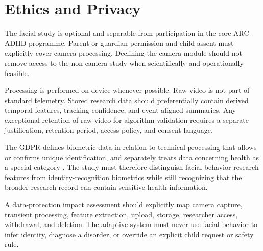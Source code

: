 \section{Ethics and Privacy}

The facial study is optional and separable from participation in the core ARC-ADHD programme. Parent or guardian permission and child assent must explicitly cover camera processing. Declining the camera module should not remove access to the non-camera study when scientifically and operationally feasible.

Processing is performed on-device whenever possible. Raw video is not part of standard telemetry. Stored research data should preferentially contain derived temporal features, tracking confidence, and event-aligned summaries. Any exceptional retention of raw video for algorithm validation requires a separate justification, retention period, access policy, and consent language.

The GDPR defines biometric data in relation to technical processing that allows or confirms unique identification, and separately treats data concerning health as a special category \parencite{eu2016gdpr}. The study must therefore distinguish facial-behavior research features from identity-recognition biometrics while still recognizing that the broader research record can contain sensitive health information.

A data-protection impact assessment should explicitly map camera capture, transient processing, feature extraction, upload, storage, researcher access, withdrawal, and deletion. The adaptive system must never use facial behavior to infer identity, diagnose a disorder, or override an explicit child request or safety rule.
